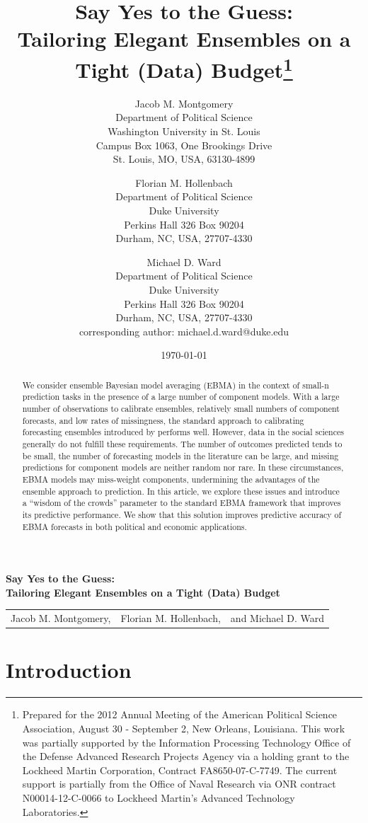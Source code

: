 \documentclass[12pt,fullpage,endnotes]{article}
\title{Say Yes to the Guess: \\ Tailoring Elegant Ensembles on a Tight
  (Data) Budget\thanks{Prepared for the 2012 Annual Meeting of the American Political Science Association, August 30 - September 2, New Orleans, Louisiana. 
This work was partially supported by the Information Processing Technology Office of the Defense Advanced Research Projects Agency via a holding grant to the Lockheed Martin Corporation, Contract FA8650-07-C-7749. The current support is partially from the Office of Naval Research via ONR contract N00014-12-C-0066 to Lockheed Martin's Advanced Technology Laboratories.
    }}
\author{
Jacob M. Montgomery\\
	Department of Political Science\\
	Washington University in St. Louis\\
	Campus Box 1063, One Brookings Drive\\
	St. Louis, MO, USA, 63130-4899 
	\and
Florian M. Hollenbach  \\
	Department of Political Science\\
	Duke University\\
	Perkins Hall 326 Box 90204\\
	Durham, NC, USA, 27707-4330
	\and
Michael D. Ward\\
	Department of Political Science\\
	Duke University\\
	Perkins Hall 326 Box 90204\\
	Durham, NC, USA, 27707-4330\\
	corresponding author: michael.d.ward@duke.edu
}
\date{\today}
\begin{document}
\maketitle
\thispagestyle{empty}
\clearpage
\pagestyle{myheadings}
\newpage
\singlespacing

\thispagestyle{empty}

{\centering \bf \large Say Yes to the Guess: \\ Tailoring Elegant Ensembles on a Tight (Data) Budget \\}


\begin{center}
\begin{tabular}{c@{ }c@{ }c}

Jacob M. Montgomery, & Florian M. Hollenbach, & and Michael D. Ward\\
\end{tabular}
\end{center}

\begin{abstract}
  \noindent We consider ensemble Bayesian model averaging (EBMA) in
  the context of small-n prediction tasks in the presence of a large
  number of component models.  With a large number of observations to
  calibrate ensembles, relatively small numbers of component
  forecasts, and low rates of missingness, the standard approach to
  calibrating forecasting ensembles introduced by \cite{Raftery:2005}
  performs well. However, data in the social sciences generally do not
  fulfill these requirements. The number of outcomes predicted tends
  to be small, the number of forecasting models in the literature can
  be large, and missing predictions for component models are neither
  random nor rare. In these circumstances, EBMA models may miss-weight
  components, undermining the advantages of the ensemble approach to
  prediction.  In this article, we explore these issues and introduce
  a ``wisdom of the crowds'' parameter to the standard EBMA framework
  that improves its predictive performance. We show that this solution
  improves predictive accuracy of EBMA forecasts in both political and
  economic applications.
\end{abstract}

\doublespacing


\setcounter{page}{1}

\section{Introduction}
\end{document}
